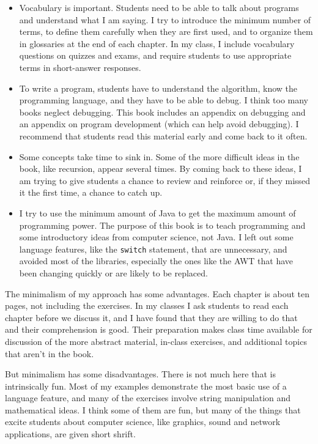 \documentclass[12pt]{book}
\theoremstyle{definition}
\begin{document}
\begin{itemize}

\item Vocabulary is important.  Students need to be able to talk
about programs and understand what I am saying.  I try to
introduce the minimum number of terms, to define them carefully 
when they are first used, and to organize them in glossaries
at the end of each chapter.  In my class, I include vocabulary
questions on quizzes and exams, and require students to use
appropriate terms in short-answer responses.

\item To write a program, students have to understand the
algorithm, know the programming language, and they have to be
able to debug.  I think too many books neglect debugging.  This
book includes an appendix on debugging and an appendix on program
development (which can help avoid debugging).  I recommend that
students read this material early and come back to it often.

\item Some concepts take time to sink in.  Some of the more
difficult ideas in the book, like recursion, appear several times.
By coming back to these ideas, I am trying to give students a
chance to review and reinforce or, if they missed it the first time,
a chance to catch up.

\item I try to use the minimum amount of Java to get the
maximum amount of programming power.  The purpose of this book
is to teach programming and some introductory ideas from computer
science, not Java.  I left out some language features, like
the {\tt switch} statement, that are unnecessary, and avoided
most of the libraries, especially the ones like the AWT that have been
changing quickly or are likely to be replaced.

\end{itemize}

The minimalism of my approach has some advantages.
Each chapter is about ten pages, not including the exercises.
In my classes I ask students to read each chapter before we
discuss it, and I have found that they are willing to do that
and their comprehension is good.  Their preparation makes
class time available for discussion of the more abstract material,
in-class exercises, and additional topics that aren't in the
book.

But minimalism has some disadvantages.  There is not much here
that is intrinsically fun.  Most of my examples demonstrate the
most basic use of a language feature, and many of the exercises
involve string manipulation and mathematical ideas.  I think some
of them are fun, but many of the things that excite students
about computer science, like graphics, sound and network applications,
are given short shrift.
\end{document}
